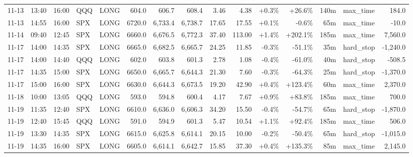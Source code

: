 \documentclass[11pt,a4paper,twoside]{article}
\begin{document}
\begin{landscape}
\begin{center}
\begin{longtable}{>{\color{txtmain}}l l l l l r r r r r r r r >{\color{txtmain}}l r}
11-13 & 13:40 & 16:00 & QQQ & LONG & 604.0 & 606.7 & 608.4 & 3.46 & 4.38 & \textcolor{wingreen}{+0.3\%} & \textcolor{wingreen}{+26.6\%} & 140m & max\_time & \textcolor{wingreen}{184.0} \\
11-13 & 14:55 & 16:00 & SPX & LONG & 6720.0 & 6,733.4 & 6,738.7 & 17.65 & 17.55 & \textcolor{wingreen}{+0.1\%} & \textcolor{lossred}{-0.6\%} & 65m & max\_time & \textcolor{lossred}{-10.0} \\
11-14 & 09:40 & 12:45 & SPX & LONG & 6660.0 & 6,676.5 & 6,772.3 & 37.40 & 113.00 & \textcolor{wingreen}{+1.4\%} & \textcolor{wingreen}{+202.1\%} & 185m & max\_time & \textcolor{wingreen}{7,560.0} \\
11-17 & 14:00 & 14:35 & SPX & LONG & 6665.0 & 6,682.5 & 6,665.7 & 24.25 & 11.85 & \textcolor{lossred}{-0.3\%} & \textcolor{lossred}{-51.1\%} & 35m & hard\_stop & \textcolor{lossred}{-1,240.0} \\
11-17 & 14:00 & 14:40 & QQQ & LONG & 602.0 & 603.8 & 601.3 & 2.78 & 1.08 & \textcolor{lossred}{-0.4\%} & \textcolor{lossred}{-61.0\%} & 40m & hard\_stop & \textcolor{lossred}{-508.5} \\
11-17 & 14:35 & 15:00 & SPX & LONG & 6650.0 & 6,665.7 & 6,644.3 & 21.30 & 7.60 & \textcolor{lossred}{-0.3\%} & \textcolor{lossred}{-64.3\%} & 25m & hard\_stop & \textcolor{lossred}{-1,370.0} \\
11-17 & 15:00 & 16:00 & SPX & LONG & 6630.0 & 6,644.3 & 6,673.5 & 19.20 & 42.90 & \textcolor{wingreen}{+0.4\%} & \textcolor{wingreen}{+123.4\%} & 60m & max\_time & \textcolor{wingreen}{2,370.0} \\
11-18 & 10:00 & 13:05 & QQQ & LONG & 593.0 & 594.8 & 600.4 & 4.17 & 7.67 & \textcolor{wingreen}{+0.9\%} & \textcolor{wingreen}{+83.8\%} & 185m & max\_time & \textcolor{wingreen}{700.0} \\
11-19 & 11:35 & 12:40 & SPX & LONG & 6610.0 & 6,636.0 & 6,606.3 & 34.20 & 15.50 & \textcolor{lossred}{-0.4\%} & \textcolor{lossred}{-54.7\%} & 65m & hard\_stop & \textcolor{lossred}{-1,870.0} \\
11-19 & 12:40 & 15:45 & QQQ & LONG & 591.0 & 594.9 & 601.3 & 5.47 & 10.54 & \textcolor{wingreen}{+1.1\%} & \textcolor{wingreen}{+92.4\%} & 185m & max\_time & \textcolor{wingreen}{506.0} \\
11-19 & 13:30 & 14:35 & SPX & LONG & 6615.0 & 6,625.8 & 6,614.1 & 20.15 & 10.00 & \textcolor{lossred}{-0.2\%} & \textcolor{lossred}{-50.4\%} & 65m & hard\_stop & \textcolor{lossred}{-1,015.0} \\
11-19 & 14:35 & 16:00 & SPX & LONG & 6605.0 & 6,614.1 & 6,642.7 & 15.85 & 37.30 & \textcolor{wingreen}{+0.4\%} & \textcolor{wingreen}{+135.3\%} & 85m & max\_time & \textcolor{wingreen}{2,145.0} \\

\end{longtable}
\end{center}
\end{landscape}
\end{document}
